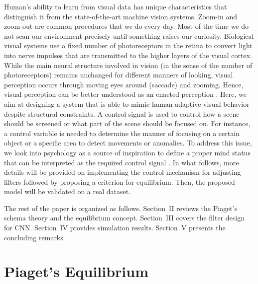 \documentclass[journal]{IEEEtran}
\begin{document}
Human's ability to learn from visual data has unique characteristics that distinguish it from the state-of-the-art machine vision systems. Zoom-in and zoom-out are common procedures that we do every day. Most of the time we do not scan our environment precisely until something raises our curiosity. Biological visual systems use a fixed number of photoreceptors in the retina to convert light into nerve impulses that are transmitted to the higher layers of the visual cortex. While the main neural structure involved in vision (in the sense of the number of photoreceptors) remains unchanged for different manners of looking, visual perception occurs through moving eyes around (saccade) and zooming. Hence, visual perception can be better understood as an enacted perception \cite{merleau1996phenomenology,noe2004action}. Here, we aim at designing a system that is able to mimic human adaptive visual behavior despite structural constraints. A control signal is used to control how a scene should be screened or what part of the scene should be focused on. For instance, a control variable is needed to determine the manner of focusing on a certain object or a specific area to detect movements or anomalies. To address this issue, we look into psychology as a source of inspiration to define a proper mind status that can be interpreted as the required control signal \cite{raab2005cognition}. In what follows, more details will be provided on implementing the control mechanism for adjusting filters followed by proposing a criterion for equilibrium. Then, the proposed model will be validated on a real dataset.

The rest of the paper is organized as follows. Section~II reviews the Piaget's schema theory and the equilibrium concept. Section~III covers the filter design for CNN. Section~IV provides simulation results. Section~V presents the concluding remarks.

\section{Piaget's Equilibrium}
\end{document}
